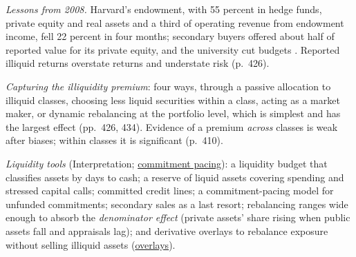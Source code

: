 \begin{qfmethod}\label{meth:endowment-liquidity-allocation}
 \emph{Lessons from 2008.} Harvard's endowment, with 55 percent in hedge funds, private equity and real assets and a third of operating revenue from endowment income, fell 22 percent in four months; secondary buyers offered about half of reported value for its private equity, and the university cut budgets \citep[chap.~13, pp.~410--412]{s7-ang}. Reported illiquid returns overstate returns and understate risk (p.~426).

\emph{Capturing the illiquidity premium}: four ways, through a passive allocation to illiquid classes, choosing less liquid securities within a class, acting as a market maker, or dynamic rebalancing at the portfolio level, which is simplest and has the largest effect (pp.~426, 434). Evidence of a premium \emph{across} classes is weak after biases; within classes it is significant (p.~410).

\emph{Liquidity tools} (Interpretation; \hyperref[meth:alternatives-allocation-approaches]{commitment pacing}): a liquidity budget that classifies assets by days to cash; a reserve of liquid assets covering spending and stressed capital calls; committed credit lines; a commitment-pacing model for unfunded commitments; secondary sales as a last resort; rebalancing ranges wide enough to absorb the \emph{denominator effect} (private assets' share rising when public assets fall and appraisals lag); and derivative overlays to rebalance exposure without selling illiquid assets (\hyperref[ex:endowment-derivative-overlay-case]{overlays}).


\end{qfmethod}
